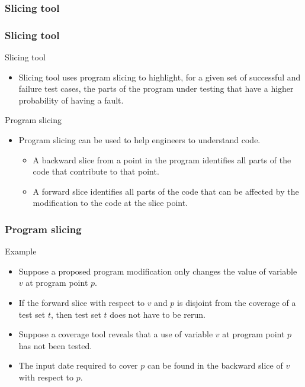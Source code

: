 \begin{frame}[c,parent={cmap:jabuti-software-testing},hasnext=true,hasprev=false]
\label{cmap:jabuti-slicing-tool}
\label{cmap:slicing-tool}
\frametitle{Slicing tool}

\end{frame}


\begin{frame}[parent={cmap:jabuti-slicing-tool},hasnext=true,hasprev=true]
\label{concept:program-slicing}
\label{concept:software-slicing}
\frametitle{Slicing tool}

\begin{block:concept}{Slicing tool}
\begin{itemize}
	\item Slicing tool uses program slicing to highlight, for a given set of
	successful and failure test cases, the parts of the program under testing
	that have a higher probability of having a fault.
\end{itemize}
\end{block:concept}

\begin{block:concept}{Program slicing}
\begin{itemize}
	\item Program slicing can be used to help engineers to understand code.
	\begin{itemize}
		\item A backward slice from a point in the program identifies all parts
		of the code that contribute to that point.

		\item A forward slice identifies all parts of the code that can be
		affected by the modification to the code at the slice point.
	\end{itemize}
\end{itemize}
\end{block:concept}
\end{frame}


\begin{frame}
\frametitle{Program slicing}

\begin{block:ie}{Example}
\begin{itemize}
	\item Suppose a proposed program modification only changes the value of
	variable $v$ at program point $p$.

	\item If the forward slice with respect to $v$ and $p$ is disjoint from the
	coverage of a test set $t$, then test set $t$ does not have to be rerun.

	\item Suppose a coverage tool reveals that a use of variable $v$ at program
	point $p$ has not been tested.

	\item The input date required to cover $p$ can be found in the backward
	slice of $v$ with respect to $p$.
\end{itemize}
\end{block:ie}
\end{frame}



